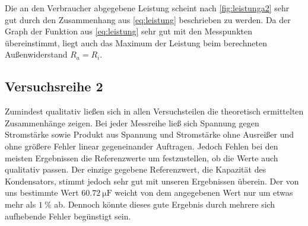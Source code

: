 Die an den Verbraucher abgegebene Leistung scheint nach \cref{fig:leistunga2} sehr gut durch den Zusammenhang aus \cref{eq:leistung} beschrieben zu werden. Da der Graph der Funktion aus \cref{eq:leistung} sehr gut mit den Messpunkten übereinstimmt, liegt auch das Maximum der Leistung beim berechneten Außenwiderstand $R_a=R_i$.
\subsection{Versuchsreihe 2}
Zumindest qualitativ ließen sich in allen Versuchsteilen die theoretisch ermittelten Zusammenhänge zeigen. Bei jeder Messreihe ließ sich Spannung gegen Stromstärke sowie Produkt aus Spannung und Stromstärke ohne Ausreißer und ohne größere Fehler linear gegeneinander Auftragen. Jedoch Fehlen bei den meisten Ergebnissen die Referenzwerte um festzustellen, ob die Werte auch qualitativ passen. Der einzige gegebene Referenzwert, die Kapazität des Kondensators, stimmt jedoch sehr gut mit unseren Ergebnissen überein. Der von uns bestimmte Wert $ \SI{60.72}{\micro\farad} $ weicht von dem angegebenen Wert nur um etwas mehr als $ \SI{1}{\percent} $ ab. Dennoch könnte dieses gute Ergebnis durch mehrere sich aufhebende Fehler begünstigt sein.
